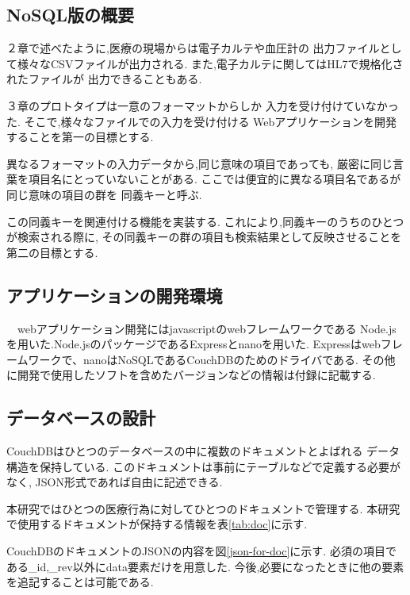 \subsection{NoSQL版の概要}
	２章で述べたように,医療の現場からは電子カルテや血圧計の
	出力ファイルとして様々なCSVファイルが出力される.
	また,電子カルテに関してはHL7で規格化されたファイルが
	出力できることもある.

  ３章のプロトタイプは一意のフォーマットからしか
	入力を受け付けていなかった.
  そこで,様々なファイルでの入力を受け付ける
  Webアプリケーションを開発することを第一の目標とする.

  異なるフォーマットの入力データから,同じ意味の項目であっても,
  厳密に同じ言葉を項目名にとっていないことがある.
  ここでは便宜的に異なる項目名であるが同じ意味の項目の群を
  同義キーと呼ぶ.

  この同義キーを関連付ける機能を実装する.
  これにより,同義キーのうちのひとつが検索される際に,
  その同義キーの群の項目も検索結果として反映させることを
	第二の目標とする.

\subsection{アプリケーションの開発環境}

　webアプリケーション開発にはjavascriptのwebフレームワークである
	Node.jsを用いた.Node.jsのパッケージであるExpressとnanoを用いた.
	Expressはwebフレームワークで、nanoはNoSQLであるCouchDBのためのドライバである.
	その他に開発で使用したソフトを含めたバージョンなどの情報は付録に記載する.


\subsection{データベースの設計}
	CouchDBはひとつのデータベースの中に複数のドキュメントとよばれる
	データ構造を保持している.
	このドキュメントは事前にテーブルなどで定義する必要がなく,
	JSON形式であれば自由に記述できる.

	本研究ではひとつの医療行為に対してひとつのドキュメントで管理する.
	本研究で使用するドキュメントが保持する情報を表\ref{tab:doc}に示す.

	CouchDBのドキュメントのJSONの内容を図\ref{json-for-doc}に示す.
	必須の項目である\_id,\_rev以外にdata要素だけを用意した.
	今後,必要になったときに他の要素を追記することは可能である.


